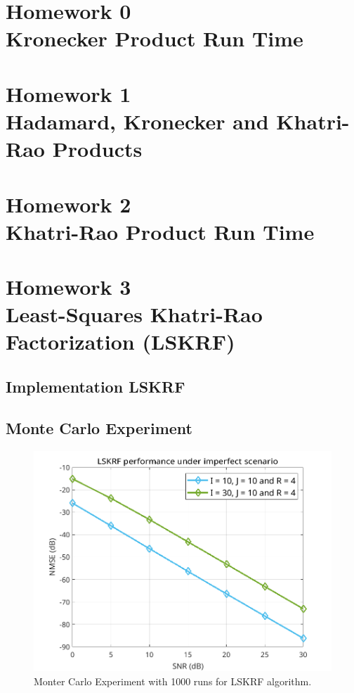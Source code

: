 \documentclass[a4paper,10pt]{article}
\begin{document}

\thispagestyle{empty}

\newpage

\thispagestyle{empty}

\newpage
\section*{Homework 0 \\ Kronecker Product Run Time}

\newpage
\section*{Homework 1 \\ Hadamard, Kronecker and Khatri-Rao Products}

\newpage
\section*{Homework 2 \\ Khatri-Rao Product Run Time}

\newpage
\section*{Homework 3 \\ Least-Squares Khatri-Rao Factorization (LSKRF)}

    \subsection*{Implementation LSKRF}

    \subsection*{Monte Carlo Experiment}

    \begin{figure}[ht!]
        \centering 
        \includegraphics[width=0.75\linewidth]{figs/hw3.png} \par 
        \caption{Monter Carlo Experiment with 1000 runs for LSKRF algorithm.}
        \label{fig:hw3} 
    \end{figure}
\end{document}
